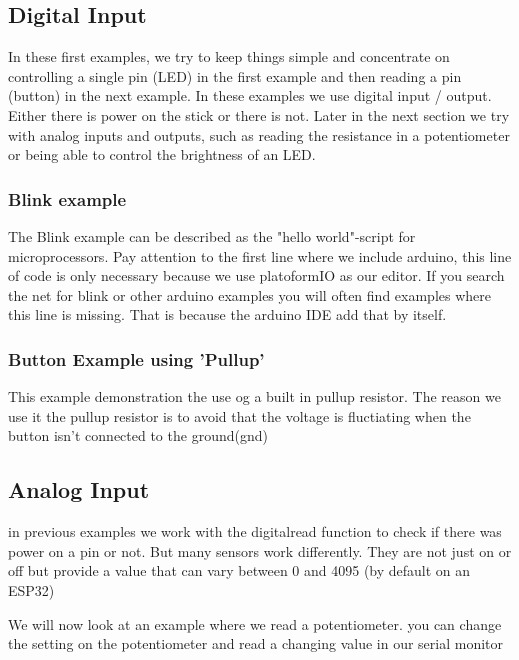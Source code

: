 \documentclass[12pt, a4paper]{article}
\begin{document}
\subsection{Digital Input}

In these first examples, we try to keep things simple and concentrate on controlling a single pin (LED) in the first example and then reading a pin (button) 
in the next example. In these examples we use digital input / output. 
Either there is power on the stick or there is not. 
Later in the next section we try with analog inputs and outputs, such as reading the resistance in a potentiometer or being able to control the brightness of an LED.

\subsubsection{Blink example}
The Blink example can be described as the "hello world"-script for microprocessors. Pay attention to the first line where we include arduino, this line of code is only necessary because we use platoformIO as our editor. If you search the net for blink or other arduino examples you will often find examples where this line is missing. That is because the arduino IDE add that by itself.




\subsubsection{Button Example using 'Pullup'}

This example demonstration the use og a built in pullup resistor. 
The reason we use it the pullup resistor is to avoid that the voltage is fluctiating when the button isn't connected to the ground(gnd)



\subsection{Analog Input}
in previous examples we work with the digitalread function to check if there was power on a pin or not. But many sensors work differently. They are not just on or off but provide a value that can vary between 0 and 4095 (by default on an ESP32)

We will now look at an example where we read a potentiometer. you can change the setting on the potentiometer and read a changing value in our serial monitor
\end{document}
